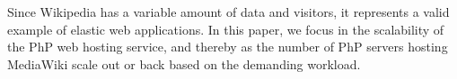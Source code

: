 

Since Wikipedia has a variable amount of data and visitors, it represents a valid example of elastic web applications. In this paper, we focus in the scalability of the PhP web hosting service, and thereby as the number of PhP servers hosting MediaWiki scale out or back based on the demanding workload.

